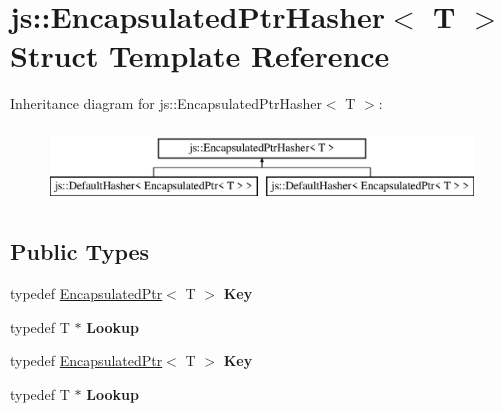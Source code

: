 \hypertarget{structjs_1_1_encapsulated_ptr_hasher}{\section{js\-:\-:Encapsulated\-Ptr\-Hasher$<$ T $>$ Struct Template Reference}
\label{structjs_1_1_encapsulated_ptr_hasher}
}
Inheritance diagram for js\-:\-:Encapsulated\-Ptr\-Hasher$<$ T $>$\-:\begin{figure}[H]
\begin{center}
\leavevmode
\includegraphics[height=2.000000cm]{structjs_1_1_encapsulated_ptr_hasher}
\end{center}
\end{figure}
\subsection*{Public Types}
\begin{DoxyCompactItemize}
\item 
\hypertarget{structjs_1_1_encapsulated_ptr_hasher_ae6069f4c419cf65370b19d7385988a03}{typedef \hyperlink{classjs_1_1_encapsulated_ptr}{Encapsulated\-Ptr}$<$ T $>$ {\bfseries Key}}\label{structjs_1_1_encapsulated_ptr_hasher_ae6069f4c419cf65370b19d7385988a03}

\item 
\hypertarget{structjs_1_1_encapsulated_ptr_hasher_aaac5fbaf512176d37626152d76bcc9eb}{typedef T $\ast$ {\bfseries Lookup}}\label{structjs_1_1_encapsulated_ptr_hasher_aaac5fbaf512176d37626152d76bcc9eb}

\item 
\hypertarget{structjs_1_1_encapsulated_ptr_hasher_ae6069f4c419cf65370b19d7385988a03}{typedef \hyperlink{classjs_1_1_encapsulated_ptr}{Encapsulated\-Ptr}$<$ T $>$ {\bfseries Key}}\label{structjs_1_1_encapsulated_ptr_hasher_ae6069f4c419cf65370b19d7385988a03}

\item 
\hypertarget{structjs_1_1_encapsulated_ptr_hasher_aaac5fbaf512176d37626152d76bcc9eb}{typedef T $\ast$ {\bfseries Lookup}}\label{structjs_1_1_encapsulated_ptr_hasher_aaac5fbaf512176d37626152d76bcc9eb}

\end{DoxyCompactItemize}

